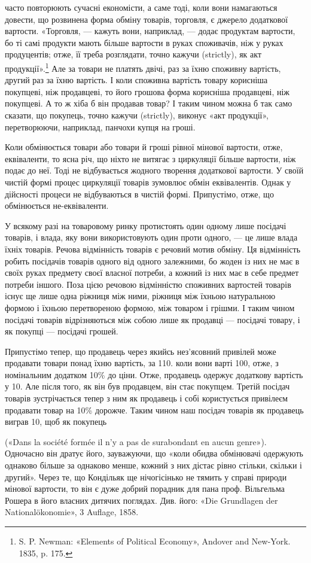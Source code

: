 часто повторюють сучасні економісти, а саме тоді, коли вони
намагаються довести, що розвинена форма обміну товарів, торговля,
є джерело додаткової вартости. «Торговля, — кажуть вони,
наприклад, — додає продуктам вартости, бо ті самі продукти
мають більше вартости в руках споживачів, ніж у руках продуцентів;
отже, її треба розглядати, точно кажучи (strictly), як
акт продукції».\footnote{
S. P. Newman: «Elements of Political Economy», Andover and
New-York. 1835, p. 175.
} Але за товари не платять двічі, раз за їхню
споживну вартість, другий раз за їхню вартість. І коли споживна
вартість товару корисніша покупцеві, ніж продавцеві, то його
грошова форма корисніша продавцеві, ніж покупцеві. А то ж
хіба б він продавав товар? І таким чином можна б так само сказати,
що покупець, точно кажучи (strictly), виконує «акт продукції»,
перетворюючи, наприклад, панчохи купця на гроші.

Коли обмінюється товари або товари й гроші рівної мінової
вартости, отже, еквіваленти, то ясна річ, що ніхто не витягає
з циркуляції більше вартости, ніж подає до неї. Тоді не відбувається
жодного творення додаткової вартости. У своїй чистій
формі процес циркуляції товарів зумовлює обмін еквівалентів.
Однак у дійсності процеси не відбуваються в чистій формі. Припустімо,
отже, що обмінюється не-еквіваленти.

У всякому разі на товаровому ринку протистоять один одному
лише посідачі товарів, і влада, яку вони використовують один
проти одного, — це лише влада їхніх товарів. Речова відмінність
товарів є речовий мотив обміну. Ця відмінність робить посідачів
товарів одного від одного залежними, бо жоден із них не має в
своїх руках предмету своєї власної потреби, а кожний із них
має в себе предмет потреби іншого. Поза цією речовою відмінністю
споживних вартостей товарів існує ще лише одна ріжниця
між ними, ріжниця між їхньою натуральною формою і їхньою
перетвореною формою, між товаром і грішми. І таким чином
посідачі товарів відрізняються між собою лише як продавці —
посідачі товару, і як покупці — посідачі грошей.

Припустімо тепер, що продавець через якийсь нез’ясовний
привілей може продавати товари понад їхню вартість, за 110.
коли вони варті 100, отже, з номінальним додатком 10\% до ціни.
Отже, продавець одержує додаткову вартість у 10. Але після
того, як він був продавцем, він стає покупцем. Третій посідач
товарів зустрічається тепер з ним як продавець і собі користується
привілеєм продавати товар на 10\% дорожче. Таким чином
наш посідач товарів як продавець виграв 10, щоб як покупець

(«Dans la société formée il n’y a pas de surabondant en aucun genre»).
Одночасно він дратує його, зауважуючи, що «коли обидва обмінювачі
одержують однаково більше за однаково менше, кожний з них дістає
рівно стільки, скільки і другий». Через те, що Кондільяк ще нічогісінько
не тямить у справі природи мінової вартости, то він є дуже добрий порадник
для пана проф. Вільгельма Рошера в його власних дитячих поглядах.
Див. його: «Die Grundlagen der Nationalökonomie», 3 Auflage,
1858.